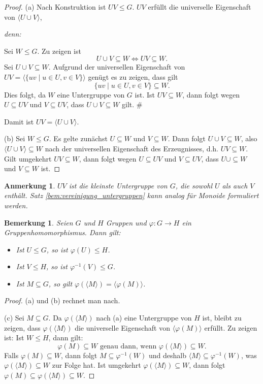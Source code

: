 \documentclass[a4paper, twoside, 11pt, ngerman]{report}
\theoremstyle{definistyle}
\newtheorem{bem}[satz]{Bemerkung}
\newtheorem{anm}[satz]{Anmerkung}
\theoremstyle{remark}
\newenvironment{denn}%
  {\par\textit{denn:}}%
  {\hfill\#\par}
\begin{document}
\begin{proof}
(a) Nach Konstruktion ist $UV \leq G$. $UV$ erfüllt die universelle Eigenschaft von $\langle U \cup V \rangle$, 
    \begin{denn}

    Sei $W \leq G$. Zu zeigen ist
    \[
    U \cup V \subseteq W \iff UV \subseteq W.
    \]
    Sei $U \cup V \subseteq W$. Aufgrund der universellen Eigenschaft von $UV = \langle\{ uv \mid u \in U, v \in V \}\rangle$ genügt es zu zeigen, dass gilt
    \[
       \{uv \mid u \in U, v \in V \} \subseteq W.
    \]
    Dies folgt, da $W$ eine Untergruppe von $G$ ist. Ist $UV \subseteq W$, dann folgt
    wegen $U \subseteq UV$ und $V \subseteq UV$, dass $U\cup V\subseteq W$ gilt.
    \end{denn}
    Damit ist $UV=\langle U\cup V\rangle$.
    
(b) Sei $W \leq G$. Es gelte zunächst $U \subseteq W$ und $V \subseteq W$. Dann folgt $U \cup V \subseteq W$, also $\langle U \cup V \rangle \subseteq W$ nach der universellen Eigenschaft des Erzeugnisses, d.h. $UV \subseteq W$.
  Gilt umgekehrt $UV \subseteq W$, dann folgt wegen $U \subseteq UV $ und $V \subseteq UV$, dass $U \cup \subseteq W$ und $V \subseteq W$ ist.       
\end{proof}



\begin{anm}\label{anm:kleinste_untergruppe_enthaelt_vereinigung}
$UV$ ist die kleinste Untergruppe von $G$, die sowohl $U$ als auch $V$ enthält. Satz \ref{bem:vereinigung_untergruppen} kann analog für Monoide formuliert werden.
\end{anm}


\begin{bem}\label{bem:gruppenhomomorphismus_bilder_und_urbilder}
Seien $G$ und $H$ Gruppen und $\varphi: G \to H$ ein Gruppenhomomorphismus. Dann gilt:
\begin{itemize}
    \item[(a)] Ist $U \leq G$, so ist $\varphi(U) \leq H$.
    \item[(b)] Ist $V \leq H$, so ist $\varphi^{-1}(V) \leq G$.
    \item[(c)] Ist $M \subseteq G$, so gilt $\varphi(\langle M \rangle) = \langle \varphi(M) \rangle$.
\end{itemize}
\end{bem}

\begin{proof}
(a) und (b) rechnet man nach. 

(c) Sei $M \subseteq G$. Da $\varphi(\langle M \rangle) $ nach (a) eine Untergruppe von $H$ ist, bleibt zu zeigen, dass $\varphi(\langle M \rangle)$ die universelle Eigenschaft von $\langle \varphi(M) \rangle$ erfüllt. Zu zeigen ist: Ist $W \leq H$, dann gilt:
\[
\varphi(M) \subseteq W \text{ genau dann, wenn } \varphi(\langle M \rangle) \subseteq W.
\]
Falls $\varphi(M) \subseteq W$, dann folgt $M \subseteq \varphi^{-1}(W)$ und deshalb $\langle M \rangle \subseteq \varphi^{-1}(W)$, was $\varphi(\langle M \rangle) \subseteq W$ zur Folge hat. Ist umgekehrt $\varphi(\langle M \rangle) \subseteq W$, dann folgt $\varphi(M) \subseteq \varphi(\langle M \rangle) \subseteq W$.
\end{proof}
\end{document}
